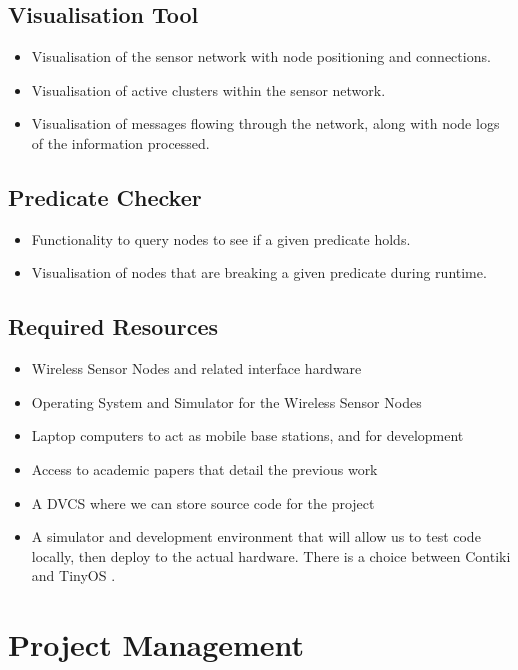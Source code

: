 \documentclass[a4paper]{article}
\begin{document}
\subsection{Visualisation Tool}
\begin{itemize}
	\item Visualisation of the sensor network with node positioning and connections.
	\item Visualisation of active clusters within the sensor network.
	\item Visualisation of messages flowing through the network, along with node logs of the information processed.
\end{itemize}

\subsection{Predicate Checker}
\begin{itemize}
	\item Functionality to query nodes to see if a given predicate holds.
	\item Visualisation of nodes that are breaking a given predicate during runtime.
\end{itemize}

\subsection{Required Resources}
\begin{itemize}
	\item Wireless Sensor Nodes and related interface hardware
	\item Operating System and Simulator for the Wireless Sensor Nodes
	\item Laptop computers to act as mobile base stations, and for development
	\item Access to academic papers that detail the previous work
	\item A DVCS where we can store source code for the project
	\item A simulator and development environment that will allow us to test code locally, then deploy to the actual hardware. There is a choice between Contiki \cite{23839452} and TinyOS \cite{levis2003tossim}.
\end{itemize}

\section{Project Management}
\end{document}
